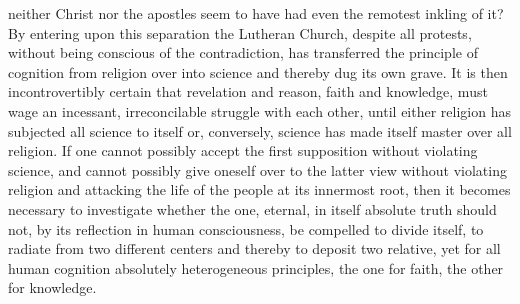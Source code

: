 \documentclass[12pt,a4paper]{article}
\begin{document}
neither Christ nor the apostles seem to have had even the remotest
inkling of it? By entering upon this separation the
Lutheran Church, despite all protests, without being conscious of the contradiction,
has transferred the principle of cognition from religion over into
science and thereby dug its own grave. It is then incontrovertibly
certain that revelation and reason, faith and knowledge, must wage an
incessant, irreconcilable struggle with each other, until either religion
has subjected all science to itself or, conversely, science has made
itself master over all religion. If one cannot possibly accept
the first supposition without violating science, and cannot possibly
give oneself over to the latter view without violating religion
and attacking the life of the people at its innermost root, then it becomes
necessary to investigate whether the one, eternal, in itself absolute
truth should not, by its reflection in human consciousness,
be compelled to divide itself, to radiate from two different centers
and thereby to deposit two relative, yet for all human cognition
absolutely heterogeneous principles, the one for faith, the other
for knowledge.
\end{document}
